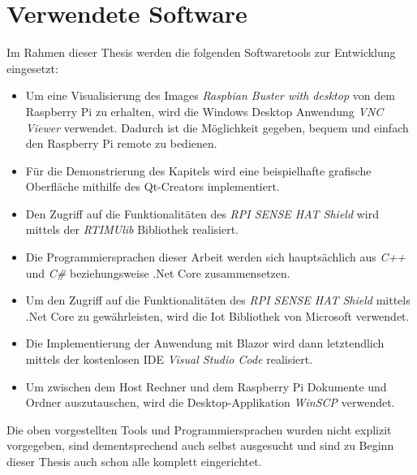 \section{Verwendete Software}
\label{sec:verwendeteSoftware}
Im Rahmen dieser Thesis werden die folgenden Softwaretools zur Entwicklung eingesetzt:
\begin{itemize}
    \item Um eine Visualisierung des Images \emph{Raspbian Buster with desktop} von dem Raspberry
    Pi zu erhalten, wird die Windows Desktop Anwendung \emph{VNC Viewer} verwendet. Dadurch ist
    die Möglichkeit gegeben, bequem und einfach den Raspberry Pi remote zu bedienen.
    \item Für die Demonstrierung des Kapitels \emph{} wird eine
    beispielhafte grafische Oberfläche mithilfe des Qt-Creators implementiert.
    \item Den Zugriff auf die Funktionalitäten des \emph{RPI SENSE HAT Shield} wird mittels der
    \emph{RTIMUlib} Bibliothek realisiert.
    \item Die Programmiersprachen dieser Arbeit werden sich hauptsächlich aus \emph{C++} und
    \emph{C\#} beziehungsweise .Net Core zusammensetzen.
    \item Um den Zugriff auf die Funktionalitäten des \emph{RPI SENSE HAT Shield} mittels .Net
    Core zu gewährleisten, wird die Iot Bibliothek von Microsoft verwendet.
    \item Die Implementierung der Anwendung mit Blazor wird dann letztendlich mittels der
    kostenlosen IDE \emph{Visual Studio Code} realisiert.
    \item Um zwischen dem Host Rechner und dem Raspberry Pi Dokumente und Ordner auszutauschen,
    wird die Desktop-Applikation \emph{WinSCP} verwendet.
\end{itemize}

Die oben vorgestellten Tools und Programmiersprachen wurden nicht explizit vorgegeben, sind
dementsprechend auch selbst ausgesucht und sind zu Beginn dieser Thesis auch schon alle komplett
eingerichtet.